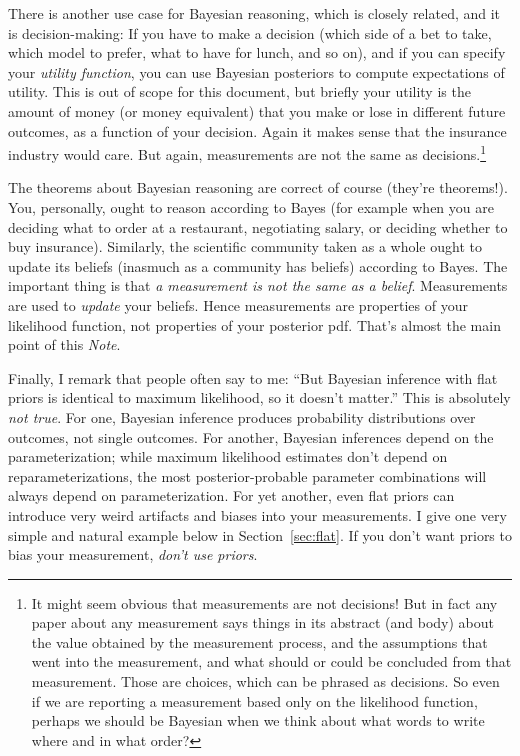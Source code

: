 \documentclass{article}
\newcommand{\documentname}{\textsl{Note}}
\newcommand{\sectionname}{Section}
\newcommand{\secref}[1]{\sectionname~\ref{#1}}
\begin{document}
There is another use case for Bayesian reasoning, which is closely related, and it is decision-making:
If you have to make a decision (which side of a bet to take, which model to prefer, what to have for lunch, and so on),
and if you can specify your \emph{utility function}, you can use Bayesian posteriors to compute expectations of utility.
This is out of scope for this document, but briefly your utility is the amount of money (or money equivalent) that you make or lose in different future outcomes, as a function of your decision.
Again it makes sense that the insurance industry would care.
But again, measurements are not the same as decisions.\footnote{%
It might seem obvious that measurements are not decisions!
But in fact any paper about any measurement says things in its abstract (and body) about the value obtained by the measurement process, and the assumptions that went into the measurement, and what should or could be concluded from that measurement.
Those are choices, which can be phrased as decisions.
So even if we are reporting a measurement based only on the likelihood function, perhaps we should be Bayesian when we think about what words to write where and in what order?}

The theorems about Bayesian reasoning are correct of course (they're theorems!).
You, personally, ought to reason according to Bayes (for example when you are deciding what to order at a restaurant, negotiating salary, or deciding whether to buy insurance).
Similarly, the scientific community taken as a whole ought to update its beliefs (inasmuch as a community has beliefs) according to Bayes.
The important thing is that \emph{a measurement is not the same as a belief}.
Measurements are used to \emph{update} your beliefs.
Hence measurements are properties of your likelihood function, not properties of your posterior pdf.
That's almost the main point of this \documentname.

Finally, I remark that people often say to me: ``But Bayesian inference with flat priors is identical to maximum likelihood, so it doesn't matter.''
This is absolutely \emph{not true}.
For one, Bayesian inference produces probability distributions over outcomes, not single outcomes.
For another, Bayesian inferences depend on the parameterization; while maximum likelihood estimates don't depend on reparameterizations, the most posterior-probable parameter combinations will always depend on parameterization.
For yet another, even flat priors can introduce very weird artifacts and biases into your measurements.
I give one very simple and natural example below in \secref{sec:flat}.
If you don't want priors to bias your measurement, \emph{don't use priors}.
\end{document}
